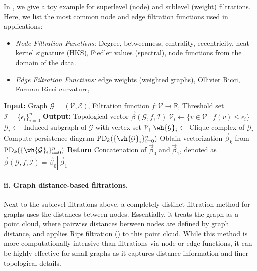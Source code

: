 In , we give a toy example for superlevel (node) and sublevel (weight) filtrations. Here, we list the most common node and edge filtration functions used in applications:

\begin{itemize}
    \item {\em Node Filtration Functions:} Degree, betweenness, centrality, eccentricity, heat kernel signature (HKS), Fiedler values (spectral), node functions from the domain of the data.
    \item {\em Edge Filtration Functions:} edge weights (weighted graphs), Ollivier Ricci, Forman Ricci curvature, 
\end{itemize}




\begin{algorithm}[t]
\caption{PH machinery for graphs (sublevel filtration) \label{alg:PH_graph}}

\begin{algorithmic}
\State \textbf{Input:} Graph $\mathcal{G} = (\mathcal{V}, \mathcal{E})$, Filtration function $f: \mathcal{V} \to \mathbb{R}$, Threshold set $\mathcal{I} = \{\epsilon_i\}_{i=0}^n$
\State \textbf{Output:} Topological vector $\vec{\beta}(\mathcal{G}, f, \mathcal{I})$
 
    \State $\mathcal{V}_i \gets \{v \in \mathcal{V} \mid f(v) \leq \epsilon_i\}$ 
    \State $\mathcal{G}_i \gets$ Induced subgraph of $\mathcal{G}$ with vertex set $\mathcal{V}_i$
    \State $\wh{\mathcal{G}}_i \gets$ Clique complex of $\mathcal{G}_i$
\EndFor
{} 
    \State Compute persistence diagram $\mathrm{PD}_k(\{\wh{\mathcal{G}}_i\}_{i=0}^n)$
    \State Obtain vectorization $\vec{\beta}_k$ from $\mathrm{PD}_k(\{\wh{\mathcal{G}}_i\}_{i=0}^n)$
\EndFor
\State \textbf{Return} Concatenation of $\vec{\beta}_0$ and $\vec{\beta}_1$, denoted as $\vec{\beta}(\mathcal{G}, f, \mathcal{I}) = \vec{\beta}_0 \mathbin\Vert \vec{\beta}_1$
\end{algorithmic}
\end{algorithm}

 


\paragraph*{ii. Graph distance-based filtrations.} Next to the sublevel filtrations above, a completely distinct filtration method for graphs uses the distances between nodes. Essentially, it treats the graph as a point cloud, where pairwise distances between nodes are defined by graph distance, and applies Rips filtration () to this point cloud. While this method is more computationally intensive than filtrations via node or edge functions, it can be highly effective for small graphs as it captures distance information and finer topological details.


